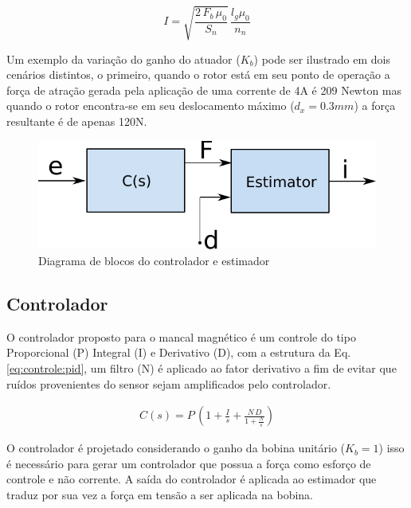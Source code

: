 	
\begin{equation}
I = \sqrt{\frac{2 \, F_b \, \mu_0}{S_n}} \, \frac{l_g \mu_0}{n_n}
\label{eq:estimator:i}
\end{equation}
	
Um exemplo da variação do ganho do atuador ($K_b$) pode ser ilustrado em dois cenários distintos, o primeiro, quando o rotor está em seu ponto de operação a força de atração gerada pela aplicação de uma corrente de 4A é 209 Newton mas quando o rotor encontra-se em seu deslocamento máximo  ($d_x = 0.3 mm$) a força resultante é de apenas 120N.

\begin{figure}[ht!]
	\centering
	\includegraphics[width=0.5\linewidth]{Figs/Modelagem/controlador_estimador}
	\caption{Diagrama de blocos do controlador e estimador}
	\label{fig:diagrama_controlador_estimador}
\end{figure}

\subsection{Controlador}

O controlador proposto para o mancal magnético é um controle do tipo Proporcional (P) Integral (I) e Derivativo (D), com a estrutura da Eq. \eqref{eq:controle:pid}, um filtro (N) é aplicado ao fator derivativo a fim de evitar que ruídos provenientes do sensor sejam amplificados pelo controlador.

\begin{align}
	C(s) = P \, \left( 1 + \frac{I}{s} + \frac{N \, D}{ 1 + \frac{N}{s}} \right)
	\label{eq:controle:pid}
\end{align}

O controlador é projetado considerando o ganho da bobina unitário ($K_b = 1$) isso é necessário para gerar um controlador que possua a força como esforço de controle e não corrente. A saída do controlador é aplicada ao estimador que traduz por sua vez a força em tensão a ser aplicada na bobina. 

